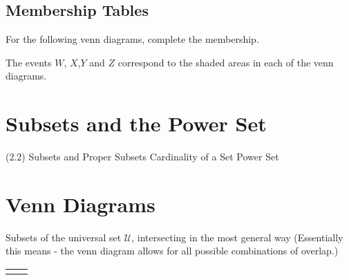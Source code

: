 \subsection*{Membership Tables}
For the following venn diagrams, complete the membership.

The events $W$, $X$,$Y$ and $Z$ correspond to the shaded areas in each of the venn diagrams.



\section{Subsets and the Power Set} (2.2)
Subsets and Proper Subsets
Cardinality of a Set
Power Set




\section*{Venn Diagrams}

Subsets of the universal set $\mathcal{U}$, intersecting in the most general way (Essentially this means - the venn diagram allows for all possible combinations of overlap.)

\begin{center}
\begin{tabular}{|c|c|}
\hline  &  \\ 
\hline  &  \\ 
\hline 
\end{tabular} 
\end{center}
